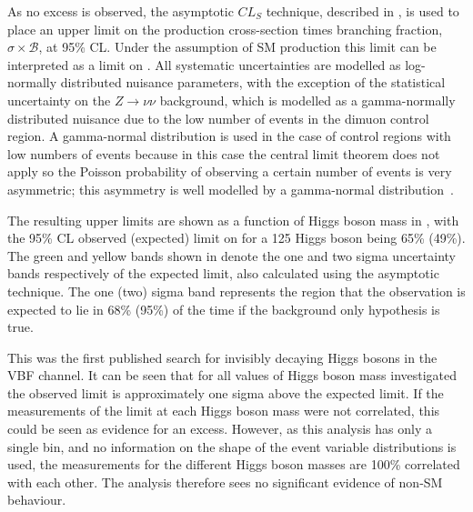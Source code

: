 As no excess is observed, the asymptotic $CL_{S}$ technique, described in , is used to place an upper limit on the production cross-section times branching fraction, $\sigma\times\mathcal{B}$, at 95\% \ac{CL}. Under the assumption of \ac{SM} production this limit can be interpreted as a limit on \BRinv. All systematic uncertainties are modelled as log-normally distributed nuisance parameters, with the exception of the statistical uncertainty on the $Z\rightarrow\nu\nu$ background, which is modelled as a gamma-normally distributed nuisance due to the low number of events in the dimuon control region. A gamma-normal distribution is used in the case of control regions with low numbers of events because in this case the central limit theorem does not apply so the Poisson probability of observing a certain number of events is very asymmetric; this asymmetry is well modelled by a gamma-normal distribution~\cite{2003sppp.conf...35L}.

The resulting upper limits are shown as a function of Higgs boson mass in , with the 95\% \ac{CL} observed (expected) limit on \BRinv for a 125 \GeV Higgs boson being 65\% (49\%). The green and yellow bands shown in  denote the one and two sigma uncertainty bands respectively of the expected limit, also calculated using the asymptotic technique. The one (two) sigma band represents the region that the observation is expected to lie in 68\% (95\%) of the time if the background only hypothesis is true.

This was the first published search for invisibly decaying Higgs bosons in the \ac{VBF} channel. It can be seen that for all values of Higgs boson mass investigated the observed limit is approximately one sigma above the expected limit. If the measurements of the limit at each Higgs boson mass were not correlated, this could be seen as evidence for an excess. However, as this analysis has only a single bin, and no information on the shape of the event variable distributions is used, the measurements for the different Higgs boson masses are 100\% correlated with each other. The analysis therefore sees no significant evidence of non-\ac{SM} behaviour.

